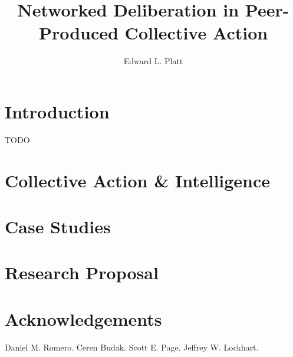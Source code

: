 \documentclass{book}
\author{Edward L. Platt}
\title{Networked Deliberation in Peer-Produced Collective Action}
\begin{document}
\maketitle

\tableofcontents

\chapter{Introduction}
TODO

\chapter{Collective Action \& Intelligence}


\chapter{Case Studies}


\chapter{Research Proposal}


\chapter*{Acknowledgements}
Daniel M. Romero.
Ceren Budak.
Scott E. Page.
Jeffrey W. Lockhart.

\nocite{*}


\end{document}
